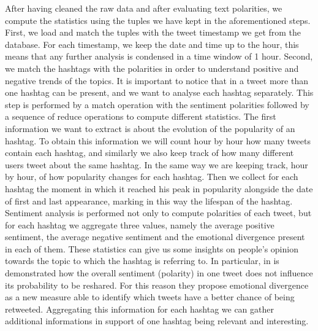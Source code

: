 After having cleaned the raw data and after evaluating text polarities, we compute the statistics using the tuples we have kept in the aforementioned steps. 
First, we load and match the tuples with the tweet timestamp we get from the database.
For each timestamp, we  keep the date and time up to the hour, this means that any further analysis is condensed in a time window of 1 hour.
Second, we match the hashtags with the polarities in order to understand positive and negative trends of the topics. 
It is important to notice that in a tweet more than one hashtag can be present, and we want to analyse each hashtag separately.
This step is performed by a match operation with the sentiment polarities followed by a sequence of reduce operations to compute different statistics.
The first information we want to extract is about the evolution of the popularity of an hashtag.
To obtain this information we will count hour by hour how many tweets contain each hashtag, and similarly we also keep track of how many different users tweet about the same hashtag.
In the same way we are keeping track, hour by hour, of how popularity changes for each hashtag.
Then we collect for each hashtag the moment in which it reached his peak in popularity alongside the date of first and last appearance, marking in this way the lifespan of the hashtag.
Sentiment analysis is performed not only to compute polarities of each tweet, but for each hashtag we aggregate three values, namely the average positive sentiment, the average negative sentiment and the emotional divergence present in each of them.
These statistics can give us some insights on people's opinion towards the topic to which the hashtag is referring to.
In particular, in \cite{DBLP:conf:icwsm:PfitznerGS12}  is demonstrated how the overall sentiment (polarity) in one tweet does not influence its probability to be reshared.
For this reason they propose emotional divergence as a new measure able to identify which tweets have a better chance of being retweeted.
Aggregating this information for each hashtag we can gather additional informations in support of one hashtag being relevant and interesting.



